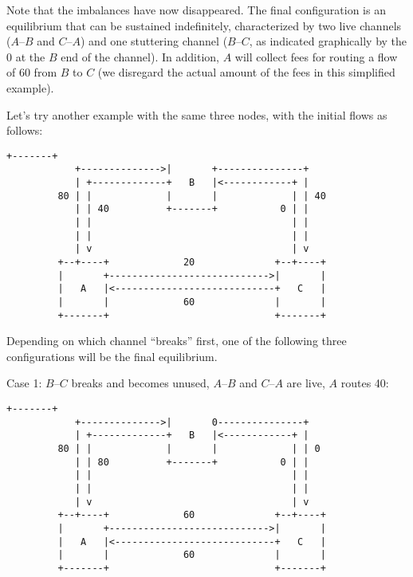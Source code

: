 \documentclass[a4paper]{article}
\begin{document}
Note that the imbalances have now disappeared. The final configuration is an equilibrium that can be sustained indefinitely, characterized by two live channels ($A$--$B$ and $C$--$A$) and one stuttering channel ($B$--$C$, as indicated graphically by the 0 at the $B$ end of the channel). In addition, $A$ will collect fees for routing a flow of 60 from $B$ to $C$ (we disregard the actual amount of the fees in this simplified example).

Let's try another example with the same three nodes, with the initial flows as follows:
\begin{Verbatim}[samepage=true]
                            +-------+
            +-------------->|       +---------------+
            | +-------------+   B   |<------------+ |
         80 | |             |       |             | | 40
            | | 40          +-------+           0 | |
            | |                                   | |
            | |                                   | |
            | v                                   | v
         +--+----+             20              +--+----+
         |       +---------------------------->|       |
         |   A   |<----------------------------+   C   |
         |       |             60              |       |
         +-------+                             +-------+
\end{Verbatim}

Depending on which channel ``breaks'' first, one of the following three configurations will be the final equilibrium.

Case 1: $B$--$C$ breaks and becomes unused, $A$--$B$ and $C$--$A$ are live, $A$ routes 40:
\begin{Verbatim}[samepage=true]
                            +-------+
            +-------------->|       0---------------+
            | +-------------+   B   |<------------+ |
         80 | |             |       |             | | 0
            | | 80          +-------+           0 | |
            | |                                   | |
            | |                                   | |
            | v                                   | v
         +--+----+             60              +--+----+
         |       +---------------------------->|       |
         |   A   |<----------------------------+   C   |
         |       |             60              |       |
         +-------+                             +-------+
\end{Verbatim}
\end{document}
